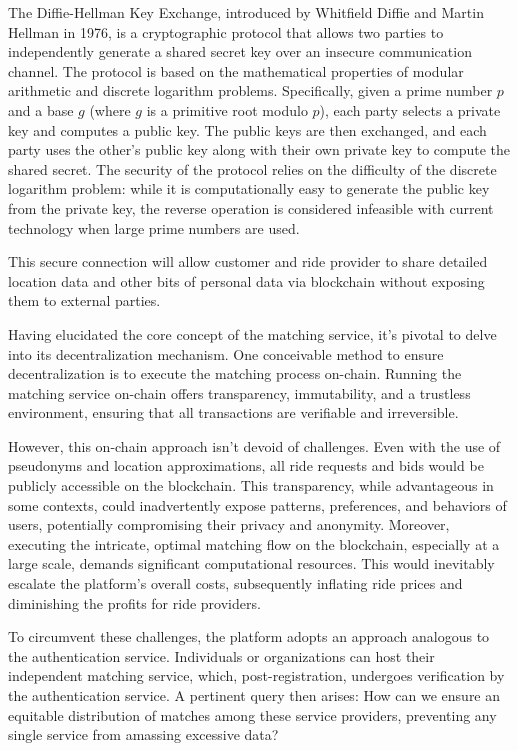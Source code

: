 The Diffie-Hellman Key Exchange, introduced by Whitfield Diffie and Martin Hellman in 1976, is a cryptographic protocol that allows two parties to independently generate a shared secret key over an insecure communication channel. The protocol is based on the mathematical properties of modular arithmetic and discrete logarithm problems. Specifically, given a prime number \( p \) and a base \( g \) (where \( g \) is a primitive root modulo \( p \)), each party selects a private key and computes a public key. The public keys are then exchanged, and each party uses the other's public key along with their own private key to compute the shared secret. The security of the protocol relies on the difficulty of the discrete logarithm problem: while it is computationally easy to generate the public key from the private key, the reverse operation is considered infeasible with current technology when large prime numbers are used.

This secure connection will allow customer and ride provider to share detailed location data and other bits of personal data via blockchain without exposing them to external parties.

Having elucidated the core concept of the matching service, it's pivotal to delve into its decentralization mechanism. One conceivable method to ensure decentralization is to execute the matching process on-chain. Running the matching service on-chain offers transparency, immutability, and a trustless environment, ensuring that all transactions are verifiable and irreversible.

However, this on-chain approach isn't devoid of challenges. Even with the use of pseudonyms and location approximations, all ride requests and bids would be publicly accessible on the blockchain. This transparency, while advantageous in some contexts, could inadvertently expose patterns, preferences, and behaviors of users, potentially compromising their privacy and anonymity. Moreover, executing the intricate, optimal matching flow on the blockchain, especially at a large scale, demands significant computational resources. This would inevitably escalate the platform's overall costs, subsequently inflating ride prices and diminishing the profits for ride providers.

To circumvent these challenges, the platform adopts an approach analogous to the authentication service. Individuals or organizations can host their independent matching service, which, post-registration, undergoes verification by the authentication service. A pertinent query then arises: How can we ensure an equitable distribution of matches among these service providers, preventing any single service from amassing excessive data?

